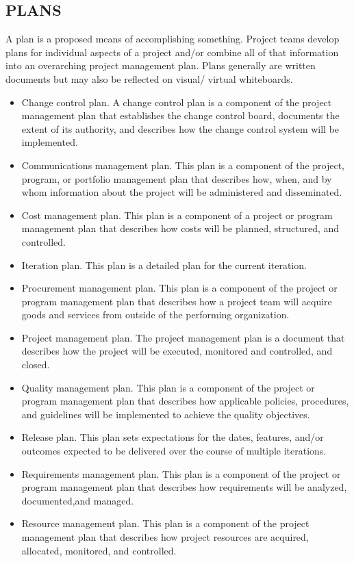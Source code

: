 \documentclass[11pt]{article}
\begin{document}
\subsection{PLANS}
\label{sec:orgbe8ecfb}
A plan is a proposed means of accomplishing something. Project teams develop plans for individual aspects of a project and/or combine all of that information into an overarching project management plan. Plans generally are written documents but may also be reflected on visual/ virtual whiteboards.
\begin{itemize}
\item Change control plan. A change control plan is a component of the project management plan that establishes the change control board, documents the extent of its authority, and describes how the change control system will be implemented.
\item Communications management plan. This plan is a component of the project, program, or portfolio management plan that describes how, when, and by whom information about the project will be administered and disseminated.
\item Cost management plan. This plan is a component of a project or program management plan that describes how costs will be planned, structured, and controlled.
\item Iteration plan. This plan is a detailed plan for the current iteration.
\item Procurement management plan. This plan is a component of the project or program management plan that describes how a project team will acquire goods and services from outside of the performing organization.
\item Project management plan. The project management plan is a document that describes how the project will be executed, monitored and controlled, and closed.
\item Quality management plan. This plan is a component of the project or program management plan that describes how applicable policies, procedures, and guidelines will be implemented to achieve the quality objectives.
\item Release plan. This plan sets expectations for the dates, features, and/or outcomes expected to be delivered over the course of multiple iterations.
\item Requirements management plan. This plan is a component of the project or program management plan that describes how requirements will be analyzed, documented,and managed.
\item Resource management plan. This plan is a component of the project management plan that describes how project resources are acquired, allocated, monitored, and controlled.

\end{itemize}
\end{document}
